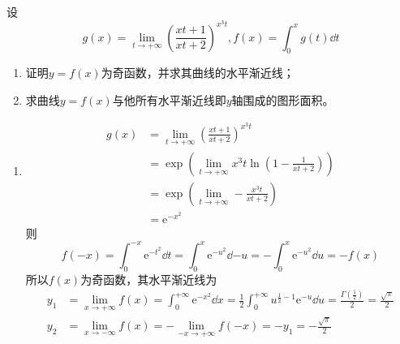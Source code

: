 \begin{example}
    设
    \[ g(x)=\lim_{t\to+\infty}\left(\frac{xt+1}{xt+2}\right)^{x^3t}, f(x)=\int_0^x g(t)\dd{t} \]
    \begin{enumerate}[(1)]
        \item 证明$y=f(x)$为奇函数，并求其曲线的水平渐近线；
        \item 求曲线$y=f(x)$与他所有水平渐近线即$y$轴围成的图形面积。
    \end{enumerate}
\end{example}
\begin{solution}
    \begin{enumerate}[(1)]
        \item
              \begin{align*}
                  g(x) & =\lim_{t\to+\infty}\left(\frac{xt+1}{xt+2}\right)^{x^3t}                  \\
                       & =\exp\left(\lim_{t\to+\infty} x^3t\ln\left(1-\frac{1}{xt+2}\right)\right) \\
                       & =\exp\left(\lim_{t\to+\infty} -\frac{x^3t}{xt+2}\right)                   \\
                       & =\mathrm{e}^{-x^2}
              \end{align*}
              则
              \[
                  f(-x)
                  = \int_0^{-x}\mathrm{e}^{-t^2}\dd{t}
                  = \int_0^{x}\mathrm{e}^{-u^2}\dd{-u}
                  = -\int_0^{x}\mathrm{e}^{-u^2}\dd{u}
                  = -f(x)
              \]
              所以$f(x)$为奇函数，其水平渐近线为
              \begin{align*}
                  y_1
                   & = \lim_{x\to+\infty} f(x)
                  = \int_0^{+\infty} \mathrm{e}^{-x^2}\dd{x}
                  = \frac{1}{2}\int_0^{+\infty} u^{\frac{1}{2}-1}\mathrm{e}^{-u}\dd{u}
                  = \frac{\Gamma\left(\frac{1}{2}\right)}{2}
                  = \frac{\sqrt{\pi}}{2}       \\
                  y_2
                   & = \lim_{x\to-\infty} f(x)
                  = - \lim_{-x\to+\infty} f(-x)
                  = -y_1 = -\frac{\sqrt{\pi}}{2}
              \end{align*}


\end{enumerate}
\end{solution}

